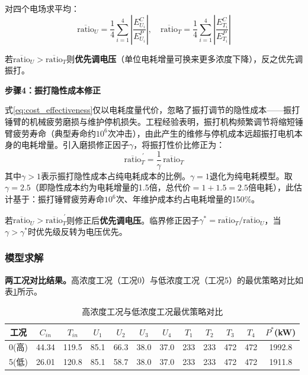 对四个电场求平均：
\begin{equation}
    \overline{\text{ratio}}_U = \frac{1}{4}\sum_{i=1}^{4}\left|\frac{E_{U_i}^{C}}{E_{U_i}^{P}}\right|,\quad \overline{\text{ratio}}_T = \frac{1}{4}\sum_{i=1}^{4}\left|\frac{E_{T_i}^{C}}{E_{T_i}^{P}}\right|
\end{equation}

若$\overline{\text{ratio}}_U > \overline{\text{ratio}}_T$则\textbf{优先调电压}（单位电耗增量可换来更多浓度下降），反之优先调振打。

\textbf{步骤4：振打隐性成本修正}

式\eqref{eq:cost_effectiveness}仅以电耗度量代价，忽略了振打调节的隐性成本——振打锤臂的机械疲劳磨损与维护停机损失。工程经验表明，振打机构频繁调节将缩短锤臂疲劳寿命（典型寿命约$10^6$次冲击），由此产生的维修与停机成本远超振打电机本身的电耗增量。引入磨损修正因子$\gamma$，将振打性价比修正为：
\begin{equation}
    \overline{\text{ratio}}_T^{\,\prime} = \frac{1}{\gamma}\,\overline{\text{ratio}}_T
    \label{eq:wear_correction}
\end{equation}
其中$\gamma > 1$表示振打隐性成本占纯电耗成本的比例。$\gamma = 1$退化为纯电耗模型。取$\gamma = 2.5$（即隐性成本约为电耗增量的1.5倍，总代价$= 1 + 1.5 = 2.5$倍电耗），此估计基于：振打锤臂疲劳寿命$10^6$次、年维护成本约占电耗增量的150\%。

若$\overline{\text{ratio}}_U > \overline{\text{ratio}}_T^{\,\prime}$则修正后\textbf{优先调电压}。临界修正因子$\gamma^* = \overline{\text{ratio}}_T / \overline{\text{ratio}}_U$，当$\gamma > \gamma^*$时优先级反转为电压优先。

\subsubsection{模型求解}

\textbf{两工况对比结果。}高浓度工况（工况0）与低浓度工况（工况5）的最优策略对比如表\ref{tab:regime_compare}所示。

\begin{table}[H]
  \centering
  \caption{高浓度工况与低浓度工况最优策略对比}
  \label{tab:regime_compare}
  \renewcommand{\arraystretch}{1.1}
  \begin{tabular}{cccccccccccc}
    \toprule
    工况 & $C_{in}$ & $T_{in}$ & $U_1$ & $U_2$ & $U_3$ & $U_4$ & $T_1$ & $T_2$ & $T_3$ & $T_4$ & $P^*$(kW) \\
    \midrule
    0(高) & 44.34 & 119.5 & 85.1 & 66.3 & 38.0 & 37.0 & 233 & 233 & 472 & 472 & 1992.8 \\
    5(低) & 26.01 & 120.8 & 85.1 & 58.7 & 38.0 & 37.0 & 233 & 233 & 472 & 472 & 1911.8 \\
    \bottomrule
  \end{tabular}
\end{table}

